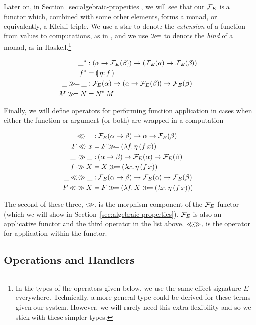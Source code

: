 Later on, in Section~\ref{sec:algebraic-properties}, we will see that our
$\mathcal{F}_E$ is a functor which, combined with some other elements, forms a
monad, or equivalently, a Kleisli triple. We use a star to denote the
\emph{extension} of a function from values to computations, as in
\cite{moggi1991notions}, and we use $\mathbin{\gg\!=}$ to denote the \emph{bind} of
a monad, as in Haskell.\footnote{In the types of the operators given below,
  we use the same effect signature $E$ everywhere. Technically, a more
  general type could be derived for these terms given our system. However,
  we will rarely need this extra flexibility and so we stick with these
  simpler types.}

\begin{align*}
  \_^* &: (\alpha \to \FF_E(\beta)) \to (\FF_E(\alpha) \to \FF_E(\beta)) \\
  f^* &= \banana{\onto{\eta} f} \\
  \_ \hsbind \_ &: \FF_E(\alpha) \to (\alpha \to \FF_E(\beta)) \to \FF_E(\beta) \\
  M \hsbind N &= \ap{N^*}{M} \\
\end{align*}

Finally, we will define operators for performing function application in
cases when either the function or argument (or both) are wrapped in a
computation.

\begin{align*}
  \_ \apl \_ &: \FF_E(\alpha \to \beta) \to \alpha \to \FF_E(\beta) \\
  F \apl x &= F \hsbind (\lam{f}{\ap{\eta}{(\ap{f}{x})}}) \\
  \_ \apr \_ &: (\alpha \to \beta) \to \FF_E(\alpha) \to \FF_E(\beta) \\
  f \apr X &= X \hsbind (\lam{x}{\ap{\eta}{(\ap{f}{x})}}) \\
  \_ \aplr \_ &: \FF_E(\alpha \to \beta) \to \FF_E(\alpha) \to \FF_E(\beta) \\
  F \aplr X &= F \hsbind (\lam{f}{X \hsbind (\lam{x}{\ap{\eta}{(\ap{f}{x})}})}) \\
\end{align*}

The second of these three, $\mathbin{\cdot\!\!\gg}$, is the morphism component of the $\mathcal{F}_E$
functor (which we will show in
Section~\ref{sec:algebraic-properties}). $\mathcal{F}_E$ is also an applicative
functor and the third operator in the list above, $\mathbin{\ll\!\!\cdot\!\!\gg}$, is the operator
for application within the functor.

\subsection{Operations and Handlers}
\label{ssec:operations-and-handlers}

